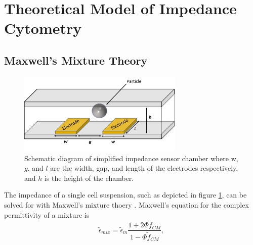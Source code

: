  
 \section[Model of Cell Suspension Impedance]{Theoretical Model of Impedance Cytometry}
 \label{sec:theory_impedance_cytometry}

\subsection{Maxwell's Mixture Theory}
 \begin{figure}[ht]
 \centering
 \includegraphics[width=0.7\textwidth]{images/cellAndElectrodes.png}
 \caption[Schematic diagram of simplified impedance sensor chamber.]{Schematic diagram of simplified impedance sensor chamber where w, $g$, and $l$ are the width, gap, and length of the electrodes respectively, and $h$ is the height of the chamber.}
 \label{fig:simplified_IS}
 \end{figure}
 
  \par The impedance of a single cell suspension, such as depicted in figure \ref{fig:simplified_IS}, can be solved for with Maxwell's mixture thoery \cite{james_clerk_maxwell_treatise_1892, sun_single-cell_2010}. Maxwell's equation for the complex permittivity of a mixture is
  \begin{equation}
      \tilde{\epsilon}_{mix} = \tilde{\epsilon}_m\frac{1 + 2\Phi\tilde{f}_{CM}}{1-\Phi\tilde{f}_{CM}},
  \end{equation}
  
